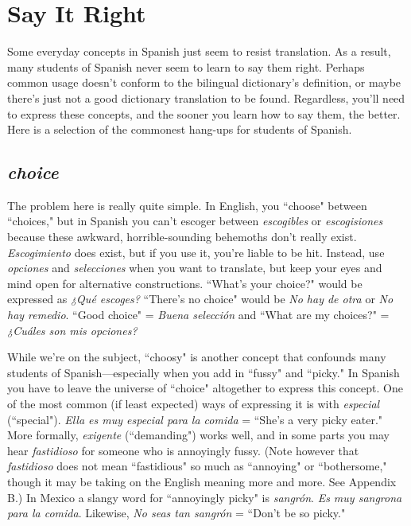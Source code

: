 \chapter{Say It Right}

Some everyday concepts in Spanish just seem to resist translation. As a result, many students of Spanish never seem to learn to say
them right. Perhaps common usage doesn't conform to the bilingual
dictionary's definition, or maybe there's just not a good dictionary
translation to be found. Regardless, you'll need to express these concepts, and the sooner you learn how to say them, the better. Here is a
selection of the commonest hang-ups for students of Spanish.

\section{\emph{choice}}

The problem here is really quite simple. In English, you
``choose" between ``choices," but in Spanish you can't escoger between
\emph{escogibles} or \emph{escogisiones} because these awkward, horrible-sounding
behemoths don't really exist. \emph{Escogimiento} does exist, but if you use
it, you're liable to be hit. Instead, use \emph{opciones} and \emph{selecciones} when
you want to translate, but keep your eyes and mind open for alternative constructions. ``What's your choice?" would be expressed as \emph{¿Qué
	escoges?} ``There's no choice" would be \emph{No hay de otra} or \emph{No hay remedio}. ``Good choice" = \emph{Buena selección} and ``What are my choices?"
= \emph{¿Cuáles son mis opciones?}

While we're on the subject, ``choosy" is another concept that
confounds many students of Spanish---especially when you add in
``fussy" and ``picky." In Spanish you have to leave the universe of
``choice" altogether to express this concept. One of the most common
(if least expected) ways of expressing it is with \emph{especial} (``special").
\emph{Ella es muy especial para la comida} = ``She's a very picky eater."
More formally, \emph{exigente} (``demanding") works well, and in some parts
you may hear \emph{fastidioso} for someone who is annoyingly fussy. (Note
however that \emph{fastidioso} does not mean ``fastidious" so much as ``annoying" or ``bothersome," though it may be taking on the English
meaning more and more. See Appendix B.) In Mexico a slangy word
for ``annoyingly picky" is \emph{sangrón}. \emph{Es muy sangrona para la comida}.
Likewise, \emph{No seas tan sangrón} = ``Don't be so picky."

